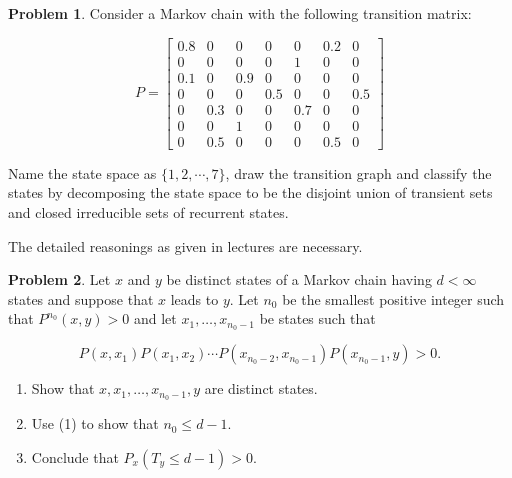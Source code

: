 \documentclass[12pt]{extreport}
\theoremstyle{definition}
\newtheorem{prob}{Problem}
\begin{document}
	\vspace{0.2cm}
    \begin{prob}
        Consider a Markov chain with the following transition matrix:
        
        \[
        P =
        \begin{bmatrix}
        0.8 & 0 & 0 & 0 & 0 & 0.2 & 0 \\
        0 & 0 & 0 & 0 & 1 & 0 & 0 \\
        0.1 & 0 & 0.9 & 0 & 0 & 0 & 0 \\
        0 & 0 & 0 & 0.5 & 0 & 0 & 0.5 \\
        0 & 0.3 & 0 & 0 & 0.7 & 0 & 0 \\
        0 & 0 & 1 & 0 & 0 & 0 & 0 \\
        0 & 0.5 & 0 & 0 & 0 & 0.5 & 0
        \end{bmatrix}
        \]
        
        Name the state space as $\{1, 2, \cdots, 7\}$, draw the transition graph and classify the states by decomposing the state space to be the disjoint union of transient sets and closed irreducible sets of recurrent states. 
        
        The detailed reasonings as given in lectures are necessary.

    \end{prob}
    \vspace{0.2cm}
    \begin{prob}
    
    Let $x$ and $y$ be distinct states of a Markov chain having $d < \infty$ states and suppose that $x$ leads to $y$. Let $n_0$ be the smallest positive integer such that $P^{n_0}(x, y) > 0$ and let $x_1, \dots, x_{n_0-1}$ be states such that
    
    \[
    P(x, x_1) P(x_1, x_2) \cdots P(x_{n_0-2}, x_{n_0-1}) P(x_{n_0-1}, y) > 0.
    \]
    
    \begin{enumerate}
        \item Show that $x, x_1, \dots, x_{n_0-1}, y$ are distinct states.
        
        \item Use (1) to show that $n_0 \leq d - 1$.
        
        \item Conclude that $P_x(T_y \leq d - 1) > 0$.
    \end{enumerate}
    
        \end{prob}
        \vspace{0.2cm}
    
\end{document}
